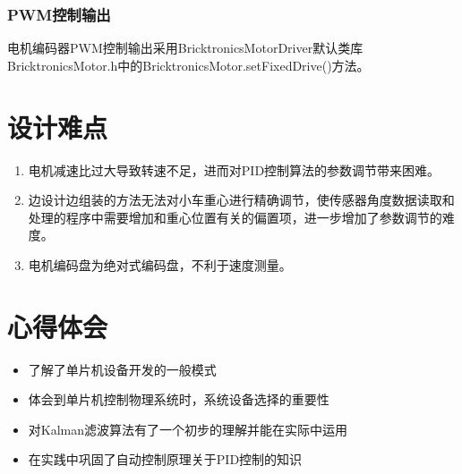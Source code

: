 \documentclass[a4paper]{ctexart}
\begin{document}
\begin{spacing}{1.5}
\subsubsection{PWM控制输出}
电机编码器PWM控制输出采用BricktronicsMotorDriver默认类库BricktronicsMotor.h中的BricktronicsMotor.setFixedDrive()方法。
\section{设计难点}
\begin{enumerate}
	\item 电机减速比过大导致转速不足，进而对PID控制算法的参数调节带来困难。
	\item 边设计边组装的方法无法对小车重心进行精确调节，使传感器角度数据读取和处理的程序中需要增加和重心位置有关的偏置项，进一步增加了参数调节的难度。
	\item 电机编码盘为绝对式编码盘，不利于速度测量。
\end{enumerate}
\section{心得体会}
\begin{itemize}
	\item 了解了单片机设备开发的一般模式
	\item 体会到单片机控制物理系统时，系统设备选择的重要性
	\item 对Kalman滤波算法有了一个初步的理解并能在实际中运用
	\item 在实践中巩固了自动控制原理关于PID控制的知识
\end{itemize}
\end{spacing}
\end{document}
